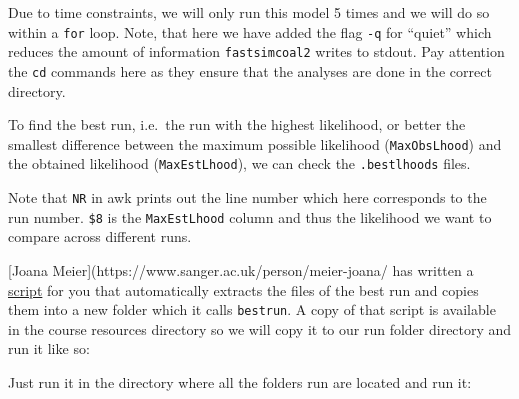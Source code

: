 \documentclass[
  letterpaper,
  DIV=11,
  numbers=noendperiod]{scrartcl}
\newenvironment{Shaded}{\begin{snugshade}}{\end{snugshade}}
\newcommand{\NormalTok}[1]{\textcolor[rgb]{0.00,0.23,0.31}{#1}}
\begin{document}
Due to time constraints, we will only run this model 5 times and we will
do so within a \texttt{for} loop. Note, that here we have added the flag
\texttt{-q} for ``quiet'' which reduces the amount of information
\texttt{fastsimcoal2} writes to stdout. Pay attention the \texttt{cd}
commands here as they ensure that the analyses are done in the correct
directory.

\begin{Shaded}
\end{Shaded}

To find the best run, i.e.~the run with the highest likelihood, or
better the smallest difference between the maximum possible likelihood
(\texttt{MaxObsLhood}) and the obtained likelihood
(\texttt{MaxEstLhood}), we can check the \texttt{.bestlhoods} files.

\begin{Shaded}
\end{Shaded}

Note that \texttt{NR} in awk prints out the line number which here
corresponds to the run number. \texttt{\$8} is the \texttt{MaxEstLhood}
column and thus the likelihood we want to compare across different runs.

{[}Joana Meier{]}(https://www.sanger.ac.uk/person/meier-joana/ has
written a
\href{https://github.com/speciationgenomics/scripts/raw/master/fsc-selectbestrun.sh}{script}
for you that automatically extracts the files of the best run and copies
them into a new folder which it calls \texttt{bestrun}. A copy of that
script is available in the course resources directory so we will copy it
to our run folder directory and run it like so:

Just run it in the directory where all the folders run are located and
run it:
\end{document}
